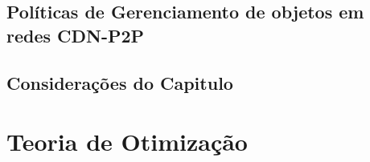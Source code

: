 \documentclass[
	12pt,				%
	oneside,			%
	a4paper,			%
	english,			%
	brazil				%
	]{abntex2ppgsi}
\begin{document}
\section{Políticas de Gerenciamento de objetos em redes CDN-P2P}



\section{Considerações do Capitulo}

\chapter{Teoria de Otimização}
\end{document}
